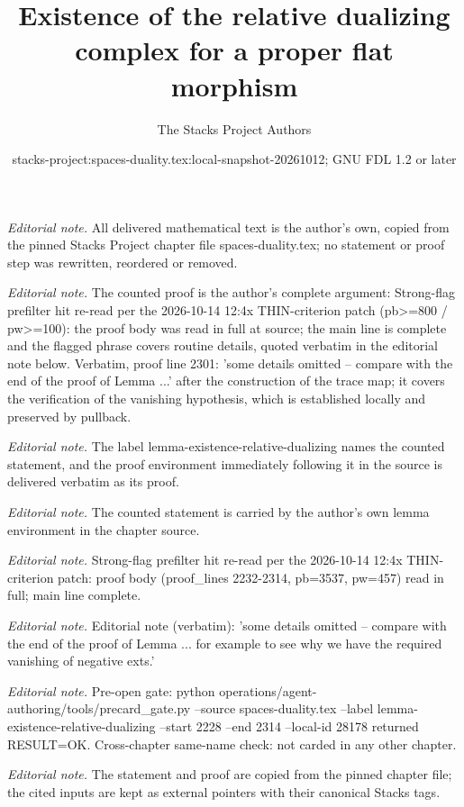 \documentclass[10pt,a4paper]{amsart}
\title{Existence of the relative dualizing complex for a proper flat morphism}
\author{The Stacks Project Authors}
\date{stacks-project:spaces-duality.tex:local-snapshot-20261012; GNU FDL 1.2 or later}
\theoremstyle{plain}
\theoremstyle{definition}
\theoremstyle{remark}
\numberwithin{equation}{subsection}
\begin{document}
\maketitle
\noindent\textit{Editorial note.} All delivered mathematical text is the author's own, copied from the pinned Stacks Project chapter file spaces-duality.tex; no statement or proof step was rewritten, reordered or removed.\par\medskip
\noindent\textit{Editorial note.} The counted proof is the author's complete argument: Strong-flag prefilter hit re-read per the 2026-10-14 12:4x THIN-criterion patch (pb>=800 / pw>=100): the proof body was read in full at source; the main line is complete and the flagged phrase covers routine details, quoted verbatim in the editorial note below. Verbatim, proof line 2301: 'some details omitted -- compare with the end of the proof of Lemma ...' after the construction of the trace map; it covers the verification of the vanishing hypothesis, which is established locally and preserved by pullback.\par\medskip
\noindent\textit{Editorial note.} The label lemma-existence-relative-dualizing names the counted statement, and the proof environment immediately following it in the source is delivered verbatim as its proof.\par\medskip
\noindent\textit{Editorial note.} The counted statement is carried by the author's own lemma environment in the chapter source.\par\medskip
\noindent\textit{Editorial note.} Strong-flag prefilter hit re-read per the 2026-10-14 12:4x THIN-criterion patch: proof body (proof\_lines 2232-2314, pb=3537, pw=457) read in full; main line complete.\par\medskip
\noindent\textit{Editorial note.} Editorial note (verbatim): 'some details omitted -- compare with the end of the proof of Lemma ... for example to see why we have the required vanishing of negative exts.'\par\medskip
\noindent\textit{Editorial note.} Pre-open gate: python operations/agent-authoring/tools/precard\_gate.py --source spaces-duality.tex --label lemma-existence-relative-dualizing --start 2228 --end 2314 --local-id 28178 returned RESULT=OK. Cross-chapter same-name check: not carded in any other chapter.\par\medskip
\noindent\textit{Editorial note.} The statement and proof are copied from the pinned chapter file; the cited inputs are kept as external pointers with their canonical Stacks tags.\par\medskip
\end{document}
